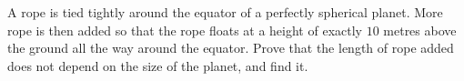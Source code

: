A rope is tied tightly around the equator of a perfectly spherical planet. More rope is then added so that the rope floats at a height of exactly $10$ metres above the ground all the way around the equator. Prove that the length of rope added does not depend on the size of the planet, and find it.
